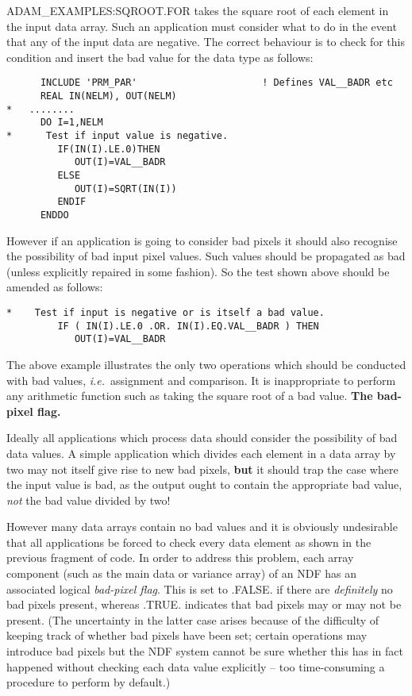 ADAM\_EXAMPLES:SQROOT.FOR takes the square root of each element
in the input data array.
Such an application must consider what to do in the event that any of the 
input data are negative.
The correct behaviour is to check for this condition and insert the 
bad value for the data type as follows:
\begin{verbatim}
      INCLUDE 'PRM_PAR'                      ! Defines VAL__BADR etc
      REAL IN(NELM), OUT(NELM)
*   ........
      DO I=1,NELM
*      Test if input value is negative.
         IF(IN(I).LE.0)THEN
            OUT(I)=VAL__BADR
         ELSE
            OUT(I)=SQRT(IN(I))
         ENDIF
      ENDDO
\end{verbatim}
However if an application is going to consider bad pixels it should also
recognise the possibility of bad input pixel values. Such values should be 
propagated as bad (unless explicitly repaired in some fashion).
So the test shown above should be amended as follows:
\begin{verbatim}
*    Test if input is negative or is itself a bad value.
         IF ( IN(I).LE.0 .OR. IN(I).EQ.VAL__BADR ) THEN
            OUT(I)=VAL__BADR
\end{verbatim}
The above example illustrates the only two operations which should be conducted
with bad values, {\it i.e.}\ assignment and comparison.
It is inappropriate to perform any arithmetic function such as taking
the square root of a bad value.
\newpage
{\large\bf The bad-pixel flag.}

Ideally all applications which process data should consider the possibility of 
bad data values. A simple application which divides each element in 
a data array by two may not 
itself give rise to new bad pixels, {\bf but} it should trap the case where the 
input value is bad, as the output ought to contain the appropriate bad value, 
{\sl not\/} the bad value divided by two!

However many data arrays contain no bad values and it is obviously
undesirable that all applications be forced to check every data 
element as shown in  the previous fragment of code.
In order to address this problem, each array component (such as 
the main data or variance array) of an NDF has an 
associated logical {\sl bad-pixel flag}.
This is set to .FALSE. if there are {\sl definitely\/} no bad pixels present,
whereas .TRUE. indicates that bad pixels may or may not be present.
(The uncertainty in the latter case arises because of the difficulty 
of keeping track of whether bad pixels have been set; 
certain operations  may introduce bad pixels but 
the NDF system cannot be sure whether this has in fact happened without checking
each data value explicitly -- too time-consuming a procedure 
to perform by default.)

